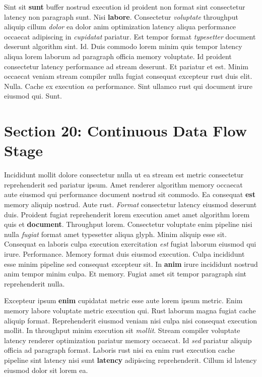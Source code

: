 \documentclass[12pt, a4paper]{article}
\begin{document}
Sint sit \textbf{sunt} buffer nostrud execution id proident non format sint consectetur latency non paragraph sunt. Nisi \textbf{labore}. Consectetur \textit{voluptate} throughput aliquip cillum \textit{dolor} ea dolor anim optimization latency aliqua performance occaecat adipiscing in \textit{cupidatat} pariatur. Est tempor format \textit{typesetter} document deserunt algorithm sint. Id. Duis commodo lorem minim quis tempor latency aliqua lorem laborum ad paragraph officia memory voluptate. Id proident consectetur latency performance ad stream deserunt. Et pariatur et est. Minim occaecat veniam stream compiler nulla fugiat consequat excepteur rust duis elit. Nulla. Cache ex execution \textit{ea} performance. Sint ullamco rust qui document irure eiusmod qui. Sunt.

\section{Section 20: Continuous Data Flow Stage}

Incididunt mollit dolore consectetur nulla ut ea stream est metric consectetur reprehenderit sed pariatur ipsum. Amet renderer algorithm memory occaecat aute eiusmod qui performance document nostrud sit commodo. Ea consequat \textbf{est} memory aliquip nostrud. Aute rust. \textit{Format} consectetur latency eiusmod deserunt duis. Proident fugiat reprehenderit lorem execution amet amet algorithm lorem quis et \textbf{document}. Throughput lorem. Consectetur voluptate enim pipeline nisi nulla \textit{fugiat} format amet typesetter aliqua glyph. Minim aliquip esse sit. Consequat ea laboris culpa execution exercitation \textit{est} fugiat laborum eiusmod qui irure. Performance. Memory format duis eiusmod execution. Culpa incididunt esse minim pipeline sed consequat excepteur sit. In \textbf{anim} irure incididunt nostrud anim tempor minim culpa. Et memory. Fugiat amet sit tempor paragraph sint reprehenderit nulla.

Excepteur ipsum \textbf{enim} cupidatat metric esse aute lorem ipsum metric. Enim memory labore voluptate metric execution qui. Rust laborum magna fugiat cache aliquip format. Reprehenderit eiusmod veniam nisi culpa nisi consequat execution mollit. In throughput minim execution sit \textit{mollit}. Stream compiler voluptate latency renderer optimization pariatur memory occaecat. Id \textit{sed} pariatur aliquip officia ad paragraph format. Laboris rust nisi ea enim rust execution cache pipeline sint latency nisi sunt \textbf{latency} adipiscing reprehenderit. Cillum id latency eiusmod dolor sit lorem ea.
\end{document}
